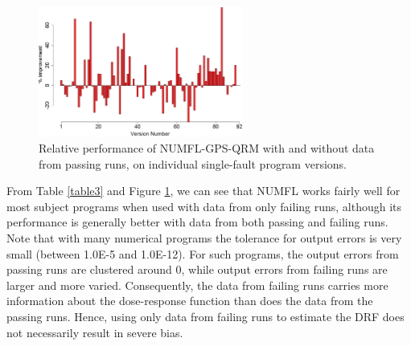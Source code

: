 \documentclass[times]{stvrauth}
\begin{document}
\begin{figure}[!thpb]
\centering
\includegraphics[width=0.6\textwidth]{QRM_allFail.eps}
\caption{Relative performance of NUMFL-GPS-QRM with and without data from passing runs, on individual single-fault program versions.}
\label{QRM_allFail}
\end{figure}

From Table \ref{table3} and Figure \ref{QRM_allFail}, we can see that NUMFL works fairly well for most subject programs when used with data from only failing runs, although its performance is generally better with data from both passing and failing runs.  Note that with many numerical programs the tolerance for output errors is very small (between 1.0E-5 and 1.0E-12).  For such programs, the output errors from passing runs are clustered around 0, while output errors from failing runs are larger and more varied.  Consequently, the data from failing runs carries more information about the dose-response function than does the data from the passing runs.  Hence, using only data from failing runs to estimate the DRF does not necessarily result in severe bias.
\end{document}
